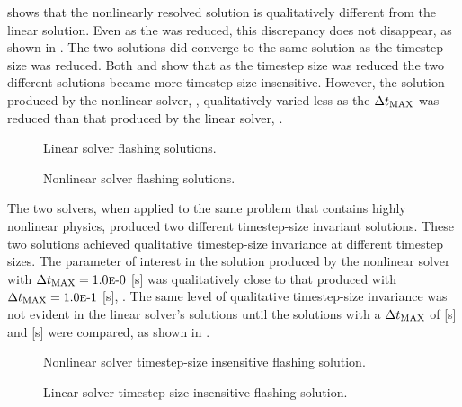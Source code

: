  shows that the nonlinearly resolved solution is qualitatively different from the linear solution.
Even as the \dtmax{} was reduced, this discrepancy does not disappear, as shown in .
The two solutions did converge to the same solution as the timestep size was reduced.
Both  and  show that as the timestep size was reduced the two different solutions became more timestep-size insensitive.
However, the solution produced by the nonlinear solver, , qualitatively varied less as the $\dtmax{}$ was reduced than that produced by the linear solver, .

\begin{figure}[h!tb]
\centering

\caption{Linear solver flashing solutions.}
\label{fig:flashingAlphaLin}
\end{figure}

\begin{figure}[h!tb]
\centering

\caption{Nonlinear solver flashing solutions.}
\label{fig:flashingAlphaNln}
\end{figure}

The two solvers, when applied to the same problem that contains highly nonlinear physics, produced two different timestep-size invariant solutions.
These two solutions achieved qualitative timestep-size invariance at different timestep sizes.
The parameter of interest in the solution produced by the nonlinear solver with $\dtmax{} = \expneg{1.0}{0}$ [s] was qualitatively close to that produced with $\dtmax{} = \expneg{1.0}{1}$ [s], .
The same level of qualitative timestep-size invariance was not evident in the linear solver's solutions until the solutions with a $\dtmax{}$ of  [s] and  [s] were compared, as shown in .

\begin{figure}[h!tb]
\centering

\caption{Nonlinear solver timestep-size insensitive flashing solution.}
\label{fig:flashingDtInsensitiveNln}
\end{figure}

\begin{figure}[h!tb]
\centering

\caption{Linear solver timestep-size insensitive flashing solution.}
\label{fig:flashingDtInsensitiveLin}
\end{figure}

